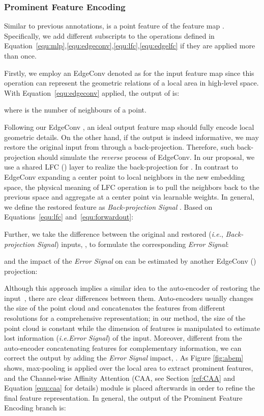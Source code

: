 \documentclass[journal,twoside]{IEEEtran}
\newcommand{\latinphrase}[1]{\textit{#1}}
\newcommand{\ie}{\latinphrase{i.e.}\xspace}
\begin{document}
\subsubsection{Prominent Feature Encoding}
Similar to previous annotations,  is a point feature of the feature map . Specifically, we add different subscripts to the operations defined in Equation~\ref{equ:mlp},\ref{equ:edgeconv},\ref{equ:lfc},\ref{equ:edgelfc} if they are applied more than once. 

Firstly, we employ an EdgeConv denoted as  for the input feature map since this operation can represent the geometric relations of a local area in high-level space. With Equation~\ref{equ:edgeconv} applied, the output of  is:

where  is the number of neighbours of a point.

Following our EdgeConv , an ideal output feature map should fully encode local geometric details. On the other hand, if the output  is indeed informative, we may restore the original input  from  through a back-projection. Therefore, such back-projection should simulate the \emph{reverse} process of EdgeConv. In our proposal, we use a shared LFC () layer to realize the back-projection for . In contrast to EdgeConv expanding a center point to local neighbors in the new embedding space, the physical meaning of LFC operation is to pull the neighbors back to the previous space  and aggregate at a center point  via learnable weights. In general, we define the restored feature as \emph{Back-projection Signal} . Based on Equations~\ref{equ:lfc} and~\ref{equ:forwardout}:


Further, we take the difference between the original and restored (\ie, \emph{Back-projection Signal}) inputs, , to formulate the corresponding \emph{Error Signal}:

and the impact of the \emph{Error Signal} on  can be estimated by another EdgeConv () projection:


Although this approach implies a similar idea to the auto-encoder of restoring the input~\cite{badrinarayanan2017segnet, qi2017pointnet++}, there are clear differences between them. Auto-encoders usually changes the size of the point cloud and concatenates the features from different resolutions for a comprehensive representation; in our method, the size of the point cloud is constant while the dimension of features is manipulated to estimate lost information (\ie \emph{Error Signal}) of the input. Moreover, different from the auto-encoder concatenating features for complementary information, we can correct the output  by adding the \emph{Error Signal} impact, . As Figure \ref{fig:abem} shows, max-pooling is applied over the local area to extract prominent features, and the Channel-wise Affinity Attention (CAA, see Section \ref{ref:CAA} and Equation \ref{equ:caa} for details) module is placed afterwards in order to refine the final feature representation. In general, the output of the Prominent Feature Encoding branch is:
  
\end{document}
